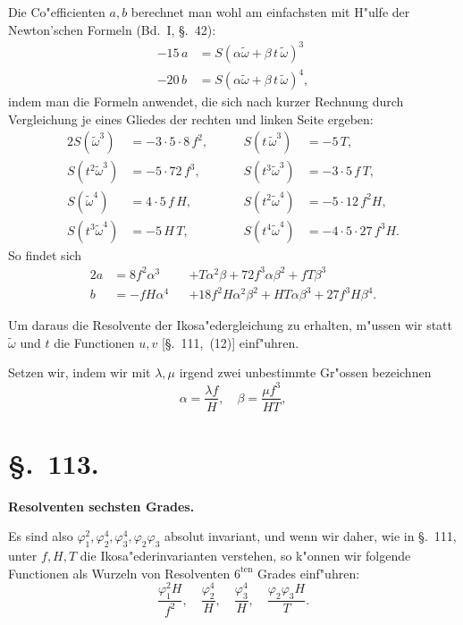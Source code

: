 \documentclass[12pt,a4paper]{article}
\theoremstyle{plain}
\begin{document}
Die Co"efficienten $a, b$ berechnet man wohl am einfachsten mit H"ulfe der Newton'schen Formeln (Bd.~I, \S.~42):
\begin{align*}
-15\,a &= S(\alpha\tilde{\omega} + \beta\,t\,\tilde{\omega})^3\\
-20\,b &= S(\alpha\tilde{\omega} + \beta\,t\,\tilde{\omega})^4,
\end{align*}
indem man die Formeln anwendet, die sich nach kurzer Rechnung durch Vergleichung je eines Gliedes der rechten und linken Seite ergeben:
\begin{alignat*}{2}
S(\tilde{\omega}^3) &= -3 \cdot 5 \cdot 8\,f^2, &\qquad S(t\,\tilde{\omega}^3) &= -5\,T,\\
S(t^2\tilde{\omega}^3) &= -5 \cdot 72\,f^3, &\qquad S(t^3\tilde{\omega}^3) &= -3 \cdot 5\,f\,T,\\
S(\tilde{\omega}^4) &= 4 \cdot 5\,f\,H, &\qquad S(t^2\tilde{\omega}^4) &= -5 \cdot 12\,f^2 H,\\
S(t^3\tilde{\omega}^4) &= -5\,H\,T, &\qquad S(t^4\tilde{\omega}^4) &= -4 \cdot 5 \cdot 27\,f^3 H.
\end{alignat*}
So findet sich
\begin{alignat}{2}\tag{4}
a &= 8f^2\alpha^3 &&+ T\alpha^2\beta + 72f^3\alpha\beta^2 + fT\beta^3\\
\tag{5}
b &= -fH\alpha^4 &&+ 18f^2H\alpha^2\beta^2 + HT\alpha\beta^3 + 27f^3H\beta^4.
\end{alignat}

Um daraus die Resolvente der Ikosa"edergleichung zu erhalten, m"ussen wir statt $\tilde{\omega}$ und $t$ die Functionen $u, v$ [\S.~111,~(12)] einf"uhren.

Setzen wir, indem wir mit $\lambda, \mu$ irgend zwei unbestimmte Gr"ossen bezeichnen
\begin{equation}\tag{6}
\alpha = \frac{\lambda f}{H}, \quad \beta = \frac{\mu f^3}{HT},
\end{equation}



\section*{\S.~113.}
\begin{center}
\large\bfseries Resolventen sechsten Grades.
\end{center}
\vspace{0.5em}

Es sind also $\varphi_1^2, \varphi_2^4, \varphi_3^4, \varphi_2\varphi_3$ absolut invariant, und wenn wir daher, wie in \S.~111, unter $f, H, T$ die Ikosa"ederinvarianten verstehen, so k"onnen wir folgende Functionen als Wurzeln von Resolventen $6^{\text{ten}}$ Grades einf"uhren:
\[\frac{\varphi_1^2 H}{f^2}, \quad \frac{\varphi_2^4}{H}, \quad \frac{\varphi_3^4}{H}, \quad \frac{\varphi_2\varphi_3 H}{T}.\]
\end{document}
